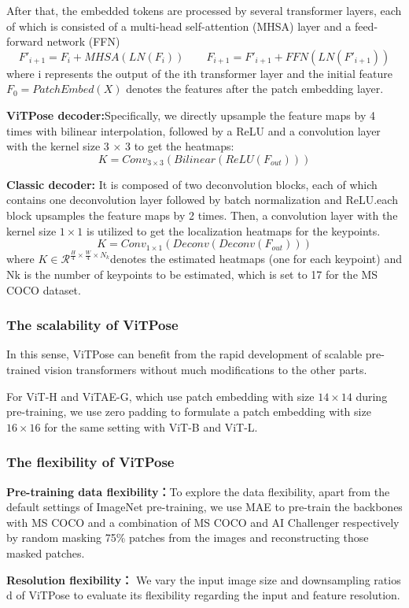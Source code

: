 \documentclass[11pt]{article}
\begin{document}
After that, the embedded tokens are processed by several transformer layers, each of which is consisted of a multi-head self-attention (MHSA) layer and a feed-forward network (FFN)
$$F'_{i+1} = F_i + MHSA(LN(F_i)) \qquad F_{i+1} = F'_{i+1} + FFN(LN(F'_{i+1}))$$
where i represents the output of the ith transformer layer and the initial feature $F_0 =
PatchEmbed(X)$ denotes the features after the patch embedding layer.

\textbf{ViTPose decoder:}Specifically, we directly upsample the feature maps by 4 times with bilinear interpolation, followed by a ReLU and a convolution layer with the kernel size 3 × 3 to get the heatmaps:
$$K = Conv_{3\times 3}(Bilinear(ReLU(F_{out})))$$

\textbf{Classic decoder:} It is composed of two deconvolution blocks, each of which contains one deconvolution layer followed by batch normalization and ReLU.each block upsamples the feature maps by 2 times. Then, a convolution layer with the kernel size $1 \times 1$ is utilized to get the localization heatmaps for the keypoints.
$$K = Conv_{1\times 1}(Deconv(Deconv(F_{out})))$$
where $K\in \mathcal{R}^{\frac{H}{4}\times \frac{W}{4}\times N_k}$denotes the estimated heatmaps (one for each keypoint) and Nk is the number of keypoints to be estimated, which is set to 17 for the MS COCO dataset.

\subsubsection{The scalability of ViTPose}
In this sense, ViTPose can benefit from the rapid development of scalable pre-trained vision transformers without much modifications to the other parts.

For ViT-H and ViTAE-G, which use patch embedding with size $14\times 14$ during pre-training, we use zero padding to formulate a patch embedding with size $16\times 16$ for the same setting with ViT-B and ViT-L.
\subsubsection{The flexibility of ViTPose}
\textbf{Pre-training data flexibility：}To explore the
data flexibility, apart from the default settings of ImageNet pre-training, we use MAE  to pre-train the backbones with MS COCO and a combination of MS COCO and AI Challenger respectively by random masking 75\% patches from the images and reconstructing those masked patches.

\textbf{Resolution flexibility：}
We vary the input image size and downsampling ratios d of ViTPose to evaluate its flexibility regarding the input and feature resolution.
\end{document}
